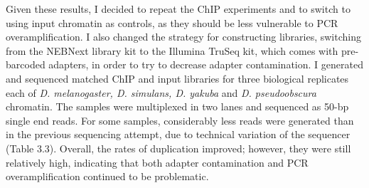 Given these results, I decided to repeat the ChIP experiments and to switch to using input chromatin as controls, as they should be less vulnerable to PCR overamplification. I also changed the strategy for constructing libraries, switching from the NEBNext library kit to the Illumina TruSeq kit, which comes with pre-barcoded adapters, in order to try to decrease adapter contamination. I generated and sequenced matched ChIP and input libraries for three biological replicates each of \emph{D. melanogaster, D. simulans, D. yakuba} and \emph{D. pseudoobscura} chromatin. The samples were multiplexed in two lanes and sequenced as 50-bp single end reads. For some samples, considerably less reads were generated than in the previous sequencing attempt, due to technical variation of the sequencer (Table 3.3). Overall, the rates of duplication improved; however, they were still relatively high, indicating that both adapter contamination and PCR overamplification continued to be problematic.

